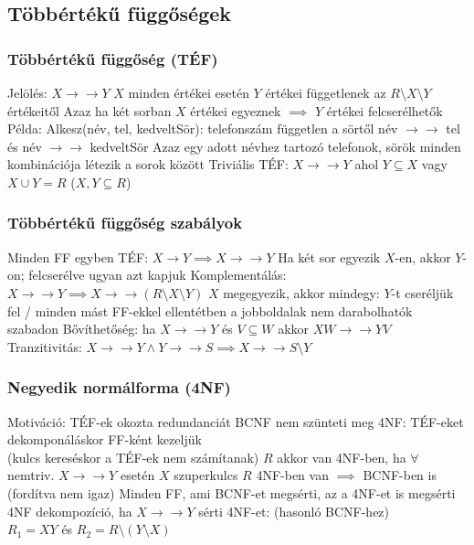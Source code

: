 \documentclass[12pt,a4paper]{article}
\def\tef{\to\to}
\begin{document}
\subsection{Többértékű függőségek}

\subsubsection{Többértékű függőség (TÉF)}

\begin{outline}
	\1 Jelölés: $X \tef Y$
	\1 $X$ minden értékei esetén $Y$ értékei függetlenek az $R \setminus X \setminus Y$ értékeitől
		\2 Azaz ha két sorban $X$ értékei egyeznek $\implies$ $Y$ értékei felcserélhetők
	\1 Példa: Alkesz(név, tel, kedveltSör): telefonszám független a sörtől
		\2 név $\tef$ tel és név $\tef$ kedveltSör
		\2 Azaz egy adott névhez tartozó telefonok, sörök minden kombinációja létezik a sorok között
	\1 Triviális TÉF: $X \tef Y$ ahol $Y \subseteq X$ vagy $X \cup Y = R$ \;\; ($X,Y \subseteq R$)
\end{outline}

\subsubsection{Többértékű függőség szabályok}

\begin{outline}
	\1 Minden FF egyben TÉF: $X \to Y \implies X \tef Y$
		\2 Ha két sor egyezik $X$-en, akkor $Y$-on; felcserélve ugyan azt kapjuk
	\1 Komplementálás: $X \tef Y \implies X \tef (R \setminus X \setminus Y)$
		\2 $X$ megegyezik, akkor mindegy: $Y$-t cseréljük fel / minden mást
	\1 FF-ekkel ellentétben a jobboldalak nem darabolhatók szabadon
	\1 Bővíthetőség: ha $X \tef Y$ és $V \subseteq W$ akkor $XW \tef YV$
	\1 Tranzitivitás: $X \tef Y \wedge Y \tef S \implies X \tef S \setminus Y$
\end{outline}

\pagebreak

\subsubsection{Negyedik normálforma (4NF)}

\begin{outline}
	\1 Motiváció: TÉF-ek okozta redundanciát BCNF nem szünteti meg
	\1 4NF: TÉF-eket dekomponáláskor FF-ként kezeljük\\
	(kulcs kereséskor a TÉF-ek nem számítanak)
	\1 $R$ akkor van 4NF-ben, ha $\forall$ nemtriv. $X \tef Y$ esetén $X$ szuperkulcs
	\1 $R$ 4NF-ben van $\implies$ BCNF-ben is (fordítva nem igaz)
		\2 Minden FF, ami BCNF-et megsérti, az a 4NF-et is megsérti
	\1 4NF dekompozíció, ha $X \tef Y$ sérti 4NF-et: (hasonló BCNF-hez)\\
	$R_1 = XY$ és $R_2 = R \setminus (Y \setminus X)$
\end{outline}
\end{document}
